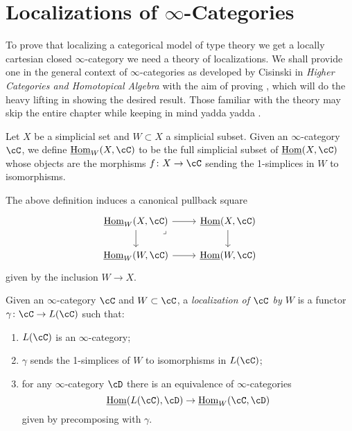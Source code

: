 \chapter*{Localizations of \texorpdfstring{$\infty$}{∞}-Categories}

To prove that localizing a categorical model of type theory we get a locally
cartesian closed $\infty$-category we need a theory of localizations. We shall
provide one in the general context of $\infty$-categories as developed by
Cisinski in \emph{Higher Categories and Homotopical Algebra} with the aim of
proving \cite[Thm.\ 7.6.16]{Cis19}, which will do the heavy lifting in showing
the desired result. Those familiar with the theory may skip the entire chapter
while keeping in mind yadda yadda .

\begin{defn}
  Let $X$ be a simplicial set and $W\subset X$ a simplicial subset. Given an
  $\infty$-category $\cC$, we define $\home_W(X,\cC)$ to be the full simplicial
  subset of $\home(X,\cC)$ whose objects are the morphisms $f\colon
  X\rightarrow\cC$ sending the 1-simplices in $W$ to isomorphisms.
\end{defn}

\begin{rmk}
  The above definition induces a canonical pullback square
  \[\begin{tikzcd}
    {\home_W(X,\cC)} & {\home(X,\cC)} \\
    {\home_W(W,\cC)} & {\home(W,\cC)}
    \arrow[from=1-1, to=2-1]
    \arrow[from=2-1, to=2-2]
    \arrow[from=1-2, to=2-2]
    \arrow[from=1-1, to=1-2]
    \arrow["\lrcorner"{anchor=center, pos=0.125}, draw=none, from=1-1, to=2-2]
  \end{tikzcd}\]
  given by the inclusion $W\rightarrow X$.
\end{rmk}

\begin{defn}
  Given an $\infty$-category $\cC$ and $W\subset\cC$, a \emph{localization of
  $\cC$ by $W$} is a functor $\gamma\colon\cC\rightarrow L(\cC)$ such that:
  \begin{enumerate}
    \item $L(\cC)$ is an $\infty$-category;
    \item $\gamma$ sends the 1-simplices of $W$ to isomorphisms in $L(\cC)$;
    \item for any $\infty$-category $\cD$ there is an equivalence of
      $\infty$-categories
      \[\home(L(\cC),\cD)\rightarrow\home_W(\cC,\cD)\]
      given by precomposing with $\gamma$.
  \end{enumerate}
\end{defn}

